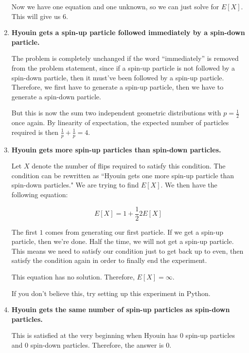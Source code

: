 \documentclass{article}
\begin{document}
\begin{enumerate}[label=(\alph*)]
    Now we have one equation and one unknown, so we can just solve for $E[X]$. This will give us $\boxed{6}$.

    \vspace{1cm}
    
    \item \textbf{Hyouin gets a spin-up particle followed immediately by a spin-down particle.}
    
    The problem is completely unchanged if the word ``immediately'' is removed from the problem statement, since if a spin-up particle is not followed by a spin-down particle, then it must've been followed by a spin-up particle. Therefore, we first have to generate a spin-up particle, then we have to generate a spin-down particle.
    
    But this is now the sum two independent geometric distributions with $p = \frac{1}{2}$ once again. By linearity of expectation, the expected number of particles required is then $\frac{1}{p} + \frac{1}{p} = \boxed{4}$.

    \vspace{1cm}
    
    \item \textbf{Hyouin gets more spin-up particles than spin-down particles.}
    
    Let $X$ denote the number of flips required to satisfy this condition. The condition can be rewritten as ``Hyouin gets one more spin-up particle than spin-down particles." We are trying to find $E[X]$. We then have the following equation:
    
    $$E[X] = 1 + \frac{1}{2} 2 E[X]$$
    
    The first $1$ comes from generating our first particle. If we get a spin-up particle, then we're done. Half the time, we will not get a spin-up particle. This means we need to satisfy our condition just to get back up to even, then satisfy the condition again in order to finally end the experiment.
    
    This equation has no solution. Therefore, $E[X] = \boxed{\infty}$.
    
    If you don't believe this, try setting up this experiment in Python.

    \vspace{1cm}
    
    \item \textbf{Hyouin gets the same number of spin-up particles as spin-down particles.}
    
    This is satisfied at the very beginning when Hyouin has $0$ spin-up particles and $0$ spin-down particles. Therefore, the answer is $\boxed{0}$.


\end{enumerate}
\end{document}
